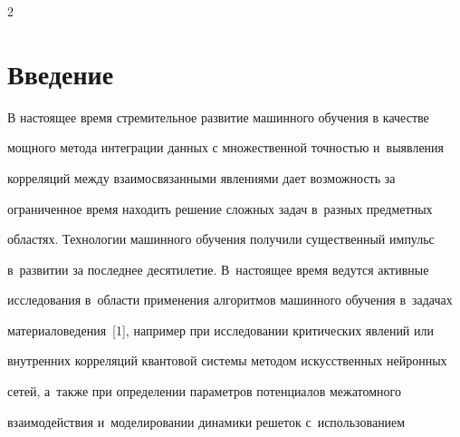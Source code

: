     




  















\thispagestyle{headings}





\begin{multicols}{2}





\label{st\stat}


     


\section{Введение}





    В настоящее время стремительное развитие машинного обучения в качестве 


мощного метода интеграции данных с множественной точ\-ностью и~выявления 


корреляций между взаимосвязанными явлениями дает возможность за 


ограниченное время находить решение сложных задач в~разных предметных 


областях. Технологии машинного обуче\-ния получили существенный импульс 


в~развитии за последнее десятилетие. В~настоящее время ведутся актив\-ные 


исследования в~об\-ласти применения алгоритмов машинного обучения в~задачах 


материаловедения~[1], например при исследовании \mbox{критических} явлений или 


внутренних корреляций квантовой сис\-те\-мы методом искусственных нейронных 


сетей, а~также при определении па\-ра\-мет\-ров потенциалов межатомного 


взаимодействия и~моделировании динамики решеток с~использованием  



\end{multicols}
